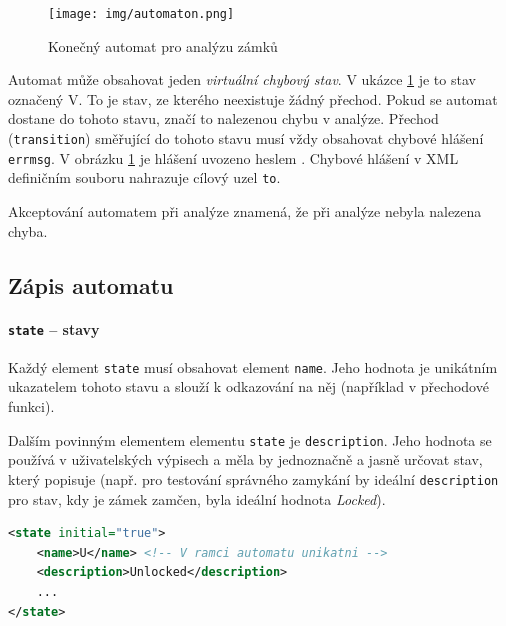 \documentclass[11pt,final,oneside]{fithesis}
\begin{document}
\begin{figure}[ht]
\begin{center}
\ifpdf
	\texttt{[image: img/automaton.png]}
\fi
\end{center}
\caption{Konečný automat pro analýzu zámků}
\label{lock-automaton}
\end{figure}


\label{virtual-state}Automat může obsahovat jeden \emph{virtuální chybový stav}. V ukázce \ref{lock-automaton} je to stav označený V. To je stav, ze kterého neexistuje žádný přechod. Pokud se automat dostane do tohoto stavu, značí to nalezenou chybu v analýze. Přechod ({\tt transition}) směřující do tohoto stavu musí vždy obsahovat chybové hlášení {\tt errmsg}. V obrázku \ref{lock-automaton} je hlášení uvozeno heslem . Chybové hlášení v XML definičním souboru nahrazuje cílový uzel {\tt to}.

Akceptování automatem při analýze znamená, že při analýze nebyla nalezena chyba. 

\subsection{Zápis automatu}

\paragraph[state]{\texttt{state} -- stavy}
Každý element \texttt{state} musí obsahovat element {\tt name}. Jeho hodnota je unikátním ukazatelem tohoto stavu a slouží k odkazování na něj (například v přechodové funkci).

Dalším povinným elementem elementu \texttt{state} je \texttt{description}. Jeho hodnota se používá v uživatelských výpisech a měla by jednoznačně a jasně určovat stav, který popisuje (např. pro testování správného zamykání by ideální \texttt{description} pro stav, kdy je zámek zamčen, byla ideální hodnota \emph{Locked}).

\begin{lstlisting}[language=XML,caption=Zápis elementů \texttt{state}{,} \texttt{name} a \texttt{description}]
<state initial="true">
    <name>U</name> <!-- V ramci automatu unikatni -->
    <description>Unlocked</description>
    ...
</state>
\end{lstlisting}
\end{document}
